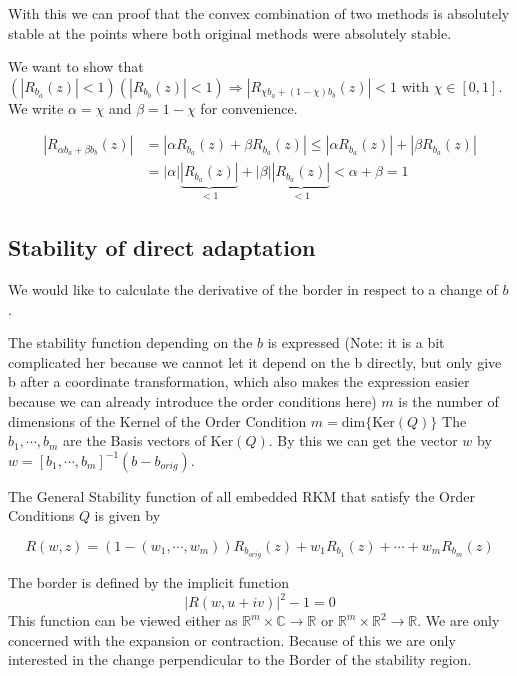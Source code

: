 \documentclass{article}
\begin{document}
With this we can proof that the convex combination of two methods is absolutely stable at the points where both original methods were absolutely stable.

We want to show that $(|R_{b_a}(z)|  < 1) (|R_{b_b}(z)| < 1) \Rightarrow |R_{\chi b_a +(1- \chi) b_b}(z)| < 1$ with $\chi \in [0,1]$.
We write $\alpha = \chi$ and $\beta = 1-\chi$ for convenience.

\begin{align}
|R_{\alpha b_a +\beta b_b}(z)| &= |\alpha R_{b_a}(z) + \beta R_{b_a}(z)| \leq |\alpha R_{b_a}(z)| + |\beta R_{b_a}(z)|\\
 &=| \alpha| \underbrace{|R_{b_a}(z)|}_{<1} + |\beta| \underbrace{|R_{b_a}(z)|}_{<1} < \alpha + \beta = 1
\end{align}


\subsection{Stability of direct adaptation}\label{sec:deriv_sr_b}

We would like to calculate the derivative of the border in respect to a change of $b$. 



The stability function depending on the $b$ is expressed (Note: it is a bit complicated her because we cannot let it depend on the b directly, but only give b after a coordinate transformation, which also makes the expression easier because we can already introduce the order conditions here)
$m$ is the number of dimensions of the Kernel of the Order Condition $m = \mathrm{dim}\{\mathrm{Ker} (Q) \}$
The $b_1,\cdots,b_m$  are the Basis vectors of $\mathrm{Ker} (Q)$. By this we can get the vector $w$ by $w = \left[b_1,\cdots,b_m\right]^{-1}(b-b_{orig})$.

The General Stability function of all embedded RKM that satisfy the Order Conditions $Q$ is given by 

\begin{equation}\label{eq:gen_stabilityf}
R(w,z) = (1-(w_1,\cdots,w_m))R_{b_{orig}}(z) + w_1 R_{b_1}(z) + \cdots + w_m R_{b_m}(z)
\end{equation}

The border is defined by the implicit function 
\begin{equation}\label{eq:border}
|R(w,u+iv)|^2 -1 = 0
\end{equation}
This function can be viewed either as $\mathbb{R}^m \times  \mathbb{C} \rightarrow \mathbb{R}$ or $\mathbb{R}^m \times  \mathbb{R}^2 \rightarrow \mathbb{R}$.
We are only concerned with the expansion or contraction. Because of this we are only interested in the change perpendicular to the Border of the stability region. 
\end{document}
